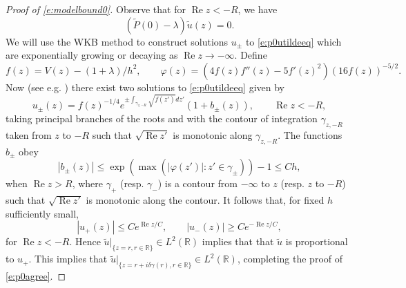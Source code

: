 \documentclass[reqno, 12pt]{amsart}
\newcommand \R {\mathbb{R}}
\DeclareMathOperator \re {Re}
\theoremstyle{definition}
\numberwithin{equation}{section}
\numberwithin{prop}{section}
\numberwithin{figure}{section}
\begin{document}
\begin{proof}[Proof of \eqref{e:modelbound0}]
Observe that for $\re z < - R$, we have
\begin{equation}\label{e:p0utildeeq}( \widetilde P(0)- \lambda)\tilde u(z) = 0.\end{equation}
We will use the WKB method to construct solutions $u_\pm$ to \eqref{e:p0utildeeq} which are exponentially growing or decaying as $\re z \to -\infty$.
Define
\[f(z) =  V(z) - (1+ \lambda)/h^2,\qquad \varphi(z) =(4f(z)f''(z) - 5f'(z)^2)(16f(z))^{-5/2}.\]
Now (see e.g. \cite[Chapter 6, Theorem 11.1]{Olver:Asymptotics}) there exist  two solutions to \eqref{e:p0utildeeq} given by
\[ u_\pm(z) = f(z)^{-1/4}e^{\pm \int_{\gamma_{z,-R}} \sqrt{f(z')}dz'}(1 + b_\pm(z)), \qquad \re z < -R,\]
taking  principal branches of the  roots and with the contour of integration $\gamma_{z,-R}$ taken from $z$ to $-R$ such that $\sqrt{\re z'}$ is monotonic along $\gamma_{z,-R}$. The functions $b_\pm$ obey
\[|b_\pm(z)| \le \exp(\max (|\varphi(z')|\colon z' \in \gamma_\pm))-1 \le Ch, \]
when $\re z> R$, where  $\gamma_+$ (resp. $\gamma_-$) is a contour from $-\infty$ to $z$ (resp. $z$ to $-R$) such that $\sqrt{\re z'}$ is monotonic along the contour. It follows that, for fixed $h$ sufficiently small,
\[|u_+(z)| \le C e^{\re z/C}, \qquad |u_-(z)| \ge C e^{-\re z/C},\]
for $\re z < - R$. Hence  $\tilde u|_{\{z = r, r \in \R\}} \in L^2(\R)$ implies that that $\tilde u$ is proportional to $u_+$. This implies that $\tilde u|_{\{z = r + i \delta \gamma(r), r \in \R\}}\in L^2(\R)$, completing the proof of \eqref{e:p0agree}.


\end{proof}
\end{document}
